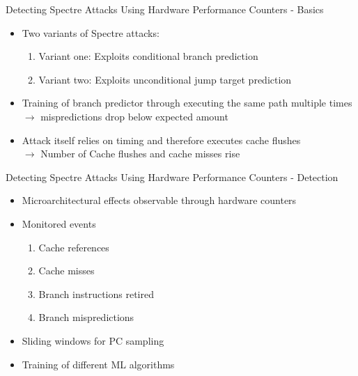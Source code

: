 \documentclass[aspectratio=169]{beamer}
\begin{document}
\begin{frame}{Detecting Spectre Attacks Using Hardware Performance Counters - Basics}
    \begin{itemize}
        \item Two variants of Spectre attacks:
              \begin{enumerate}
                  \item Variant one: Exploits conditional branch prediction
                  \item Variant two: Exploits unconditional jump target prediction
              \end{enumerate}
        \item Training of branch predictor through executing the same path multiple times
              \\ $\rightarrow$ mispredictions drop below expected amount
        \item Attack itself relies on timing and therefore executes cache flushes
              \\ $\rightarrow$ Number of Cache flushes and cache misses rise
    \end{itemize}
\end{frame}
\begin{frame}{Detecting Spectre Attacks Using Hardware Performance Counters - Detection}
    \begin{itemize}
        \item Microarchitectural effects observable through hardware counters
        \item Monitored events
              \begin{enumerate}
                  \item Cache references
                  \item Cache misses
                  \item Branch instructions retired
                  \item Branch mispredictions
              \end{enumerate}
        \item Sliding windows for PC sampling
        \item Training of different ML algorithms
    \end{itemize}
\end{frame}
\end{document}
